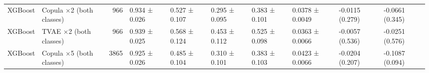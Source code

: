 \begin{table}
\begin{tabular}{llrlllllll}
XGBoost & Copula ×2 (both classes) & 966 & 0.934 ± 0.026 & 0.527 ± 0.107 & 0.295 ± 0.095 & 0.383 ± 0.101 & 0.0378 ± 0.0049 & -0.0115 (0.279) & -0.0661 (0.345) \\
XGBoost & TVAE ×2 (both classes) & 966 & 0.939 ± 0.025 & 0.568 ± 0.124 & 0.453 ± 0.112 & 0.525 ± 0.098 & 0.0363 ± 0.0066 & -0.0057 (0.536) & -0.0251 (0.576) \\
XGBoost & Copula ×5 (both classes) & 3865 & 0.925 ± 0.026 & 0.485 ± 0.104 & 0.310 ± 0.101 & 0.383 ± 0.103 & 0.0423 ± 0.0066 & -0.0204 (0.207) & -0.1087 (0.094) \\
\bottomrule
\end{tabular}
\end{table}
